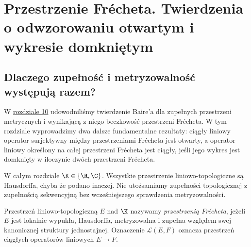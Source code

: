 \setcounter{section}{10}
\section{Przestrzenie Frécheta. Twierdzenia o odwzorowaniu otwartym i wykresie domkniętym}\label{sec:frechet-open-graph}

\subsection{Dlaczego zupełność i metryzowalność występują razem?}

W \hyperref[sec:beczkowe-bornologiczne]{rozdziale 10} udowodniliśmy twierdzenie
Baire'a dla zupełnych przestrzeni metrycznych i wynikającą z niego
beczkowość przestrzeni Frécheta. W tym rozdziale wyprowadzimy dwa dalsze
fundamentalne rezultaty: ciągły liniowy operator surjektywny między
przestrzeniami Frécheta jest otwarty, a operator liniowy określony na
całej przestrzeni Frécheta jest ciągły, jeśli jego wykres jest domknięty
w iloczynie dwóch przestrzeni Frécheta.

W całym rozdziale $\K\in\{\R,\C\}$. Wszystkie przestrzenie
liniowo-topologiczne są Hausdorffa, chyba że podano inaczej.
Nie utożsamiamy zupełności topologicznej z zupełnością sekwencyjną
bez wcześniejszego sprawdzenia metryzowalności.

\begin{definicja}\label{def:frechet11}
Przestrzeń liniowo-topologiczną $E$ nad $\K$ nazywamy
\emph{przestrzenią Frécheta}, jeżeli $E$ jest lokalnie wypukła,
Hausdorffa, metryzowalna i zupełna względem swej kanonicznej
struktury jednostajnej. Oznaczenie $\mathcal L(E,F)$ oznacza
przestrzeń ciągłych operatorów liniowych $E\to F$.
\end{definicja}

